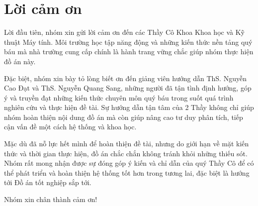 \chapter*{Lời cảm ơn}

Lời đầu tiên, nhóm xin gửi lời cảm ơn đến các Thầy Cô Khoa Khoa học và Kỹ thuật Máy tính. Môi trường học tập năng động và những kiến thức nền tảng quý báu mà nhà trường cung cấp chính là hành trang vững chắc giúp nhóm thực hiện đồ án này.

Đặc biệt, nhóm xin bày tỏ lòng biết ơn đến giảng viên hướng dẫn ThS. Nguyễn Cao Đạt và ThS. Nguyễn Quang Sang, những người đã tận tình định hướng, góp ý và truyền đạt những kiến thức chuyên môn quý báu trong suốt quá trình nghiên cứu và thực hiện đề tài. Sự hướng dẫn tận tâm của 2 Thầy không chỉ giúp nhóm hoàn thiện nội dung đồ án mà còn giúp nâng cao tư duy phân tích, tiếp cận vấn đề một cách hệ thống và khoa học.

Mặc dù đã nỗ lực hết mình để hoàn thiện đề tài, nhưng do giới hạn về mặt kiến thức và thời gian thực hiện, đồ án chắc chắn không tránh khỏi những thiếu sót. Nhóm rất mong nhận được sự đóng góp ý kiến và chỉ dẫn của quý Thầy Cô để có thể phát triển và hoàn thiện hệ thống tốt hơn trong tương lai, đặc biệt là hướng tới Đồ án tốt nghiệp sắp tới.

Nhóm xin chân thành cảm ơn!